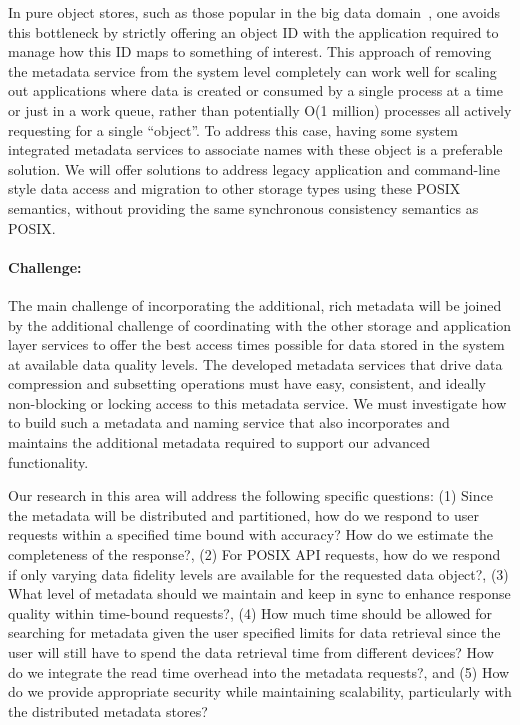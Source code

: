 In pure object stores, such as those popular in the big data
domain~\cite{Fitzpatrick:2004:memcached}, one avoids this bottleneck by
strictly offering an object ID with the application required to manage how this
ID maps to something of interest. This approach of removing the metadata
service from the system level completely can work well for scaling out
applications where data is created or consumed by a single process at a time or
just in a work queue, rather than potentially O(1 million) processes all
actively requesting for a single ``object''. To address this case, having some
system integrated metadata services to associate names with these object is a
preferable solution. We will offer solutions to address legacy application and
command-line style data access and migration to other storage types using these
POSIX semantics, without providing the same synchronous consistency semantics
as POSIX.

\paragraph{Challenge:}
The main challenge of incorporating the additional, rich metadata will be
joined by the additional challenge of coordinating with the other storage and
application layer services to offer the best access times possible for data
stored in the system at available data quality levels. The developed metadata
services that drive data compression and subsetting operations must have easy,
consistent, and ideally non-blocking or locking access to this metadata
service. We must investigate how to build such a metadata and naming service
that also incorporates and maintains the additional metadata required to
support our advanced functionality.

Our research in this area will address the following specific questions:
(1) Since the metadata will be distributed and partitioned, how do we respond
to user requests within a specified time bound with accuracy? How do we
estimate the completeness of the response?, 
(2) For POSIX API requests, how do we respond if only varying data fidelity
levels are available for the requested data object?, 
(3) What level of metadata should we maintain and keep in sync to enhance
response quality within time-bound requests?, 
(4) How much time should be allowed for searching for metadata given the user
specified limits for data retrieval since the user will still have to spend the
data retrieval time from different devices? How do we integrate the read time
overhead into the metadata requests?, and
(5) How do we provide appropriate security while maintaining scalability,
particularly with the distributed metadata stores?

